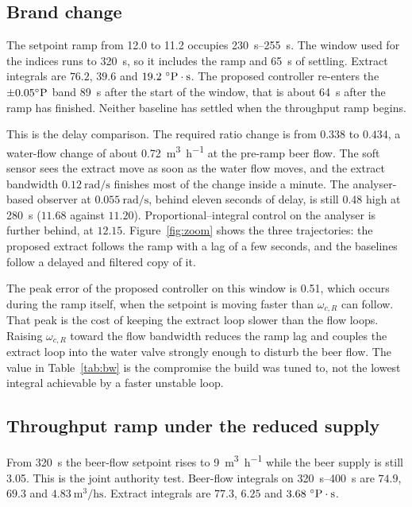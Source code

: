 \subsection{Brand change}

The setpoint ramp from \SI{12.0}{\plato} to \SI{11.2}{\plato} occupies \SIrange{230}{255}{s}. The window used for the indices runs to \SI{320}{s}, so it includes the ramp and \SI{65}{s} of settling. Extract integrals are $76.2$, $39.6$ and $19.2\ ^{\circ}\mathrm{P}\cdot\mathrm{s}$. The proposed controller re-enters the $\pm 0.05^{\circ}\mathrm{P}$ band \SI{89}{s} after the start of the window, that is about \SI{64}{s} after the ramp has finished. Neither baseline has settled when the throughput ramp begins.

This is the delay comparison. The required ratio change is from $0.338$ to $0.434$, a water-flow change of about \SI{0.72}{\cubic\metre\per\hour} at the pre-ramp beer flow. The soft sensor sees the extract move as soon as the water flow moves, and the extract bandwidth $0.12\ \si{\radian\per\second}$ finishes most of the change inside a minute. The analyser-based observer at $0.055\ \si{\radian\per\second}$, behind eleven seconds of delay, is still \SI{0.48}{\plato} high at \SI{280}{s} ($11.68$ against $11.20$). Proportional--integral control on the analyser is further behind, at $12.15$. Figure~\ref{fig:zoom} shows the three trajectories: the proposed extract follows the ramp with a lag of a few seconds, and the baselines follow a delayed and filtered copy of it.

The peak error of the proposed controller on this window is \SI{0.51}{\plato}, which occurs during the ramp itself, when the setpoint is moving faster than $\omega_{c,R}$ can follow. That peak is the cost of keeping the extract loop slower than the flow loops. Raising $\omega_{c,R}$ toward the flow bandwidth reduces the ramp lag and couples the extract loop into the water valve strongly enough to disturb the beer flow. The value in Table~\ref{tab:bw} is the compromise the build was tuned to, not the lowest integral achievable by a faster unstable loop.

\subsection{Throughput ramp under the reduced supply}

From \SI{320}{s} the beer-flow setpoint rises to \SI{9}{\cubic\metre\per\hour} while the beer supply is still \SI{3.05}{\barg}. This is the joint authority test. Beer-flow integrals on \SIrange{320}{400}{s} are $74.9$, $69.3$ and $4.83\ \si{\cubic\metre\per\hour\second}$. Extract integrals are $77.3$, $6.25$ and $3.68\ ^{\circ}\mathrm{P}\cdot\mathrm{s}$.

